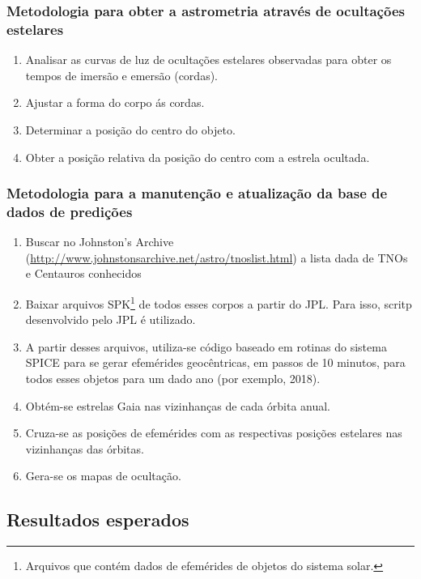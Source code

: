 \documentclass[a4paper, 11pt]{article}
\begin{document}
\subsubsection{Metodologia para obter a astrometria através de ocultações estelares}
\begin{enumerate}
  \item Analisar as curvas de luz de ocultações estelares observadas para obter os tempos de imersão e emersão (cordas).
  \item Ajustar a forma do corpo ás cordas.
  \item Determinar a posição do centro do objeto.
  \item Obter a posição relativa da posição do centro com a estrela ocultada.
\end{enumerate}

\subsubsection{Metodologia para a manuten\c c\~ao e atualiza\c c\~ao da base de dados de predi\c c\~oes}
\begin{enumerate}
  \item Buscar no Johnston's Archive (\url{http://www.johnstonsarchive.net/astro/tnoslist.html}) a lista dada de TNOs e Centauros conhecidos
  \item Baixar arquivos SPK\footnote{Arquivos que cont\'em dados de efem\'erides de objetos do sistema solar.} de todos esses corpos a partir do JPL. Para isso, scritp desenvolvido pelo JPL \'e utilizado.
  \item A partir desses arquivos, utiliza-se c\'odigo baseado em rotinas do sistema SPICE para se gerar efem\'erides geoc\^entricas, em passos de 10 minutos, para todos esses objetos para um dado ano (por exemplo, 2018).
  \item Obt\'em-se estrelas Gaia nas vizinhan\c cas de cada \'orbita anual.
  \item Cruza-se as posi\c c\~oes de efem\'erides com as respectivas posi\c c\~oes estelares nas vizinhan\c cas das \'orbitas.
  \item Gera-se os mapas de oculta\c c\~ao.
\end{enumerate}

\subsection{Resultados esperados}
\end{document}
